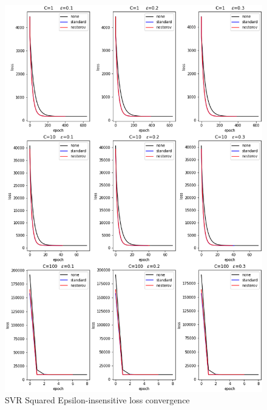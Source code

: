 \begin{figure}[H]
	\centering
	\includegraphics[scale=0.5]{img/svr_squared_eps_loss_history}
	\caption{SVR Squared Epsilon-insensitive loss convergence}
	\label{fig:svr_squared_eps_loss_history}
\end{figure}
